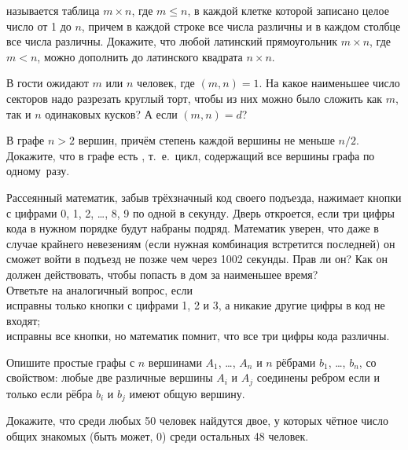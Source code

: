 \documentclass[a4paper,11pt]{article}
\begin{document}
называется таблица $m\times n$, где $m\leq n$, в каждой клетке которой записано
целое число от 1 до $n$, причем в каждой строке все числа различны
и в каждом столбце все числа различны. Докажите, что
любой латинский прямоугольник $m\times n$, где $m<n$,
можно дополнить до латинского квадрата $n\times n$.

В гости ожидают $m$ или $n$ человек, где $(m,n)=1$.
На какое наименьшее число секторов надо разрезать круглый торт,
чтобы из них можно было сложить как $m$, так и $n$ одинаковых кусков?
 А если $(m,n)=d$?



В графе $n>2$ вершин, причём степень каждой вершины не меньше $n/2$.
Докажите, что в графе есть , т.~е.~цикл,
содержащий все вершины графа по одному~разу.


 Рассеянный математик, забыв трёхзначный код своего подъезда,
нажимает кнопки с цифрами 0, 1, 2, \dots , 8, 9 по одной в секунду.
Дверь откроется, если три
цифры кода в нужном порядке будут набраны подряд. Математик уверен, что даже
в случае крайнего невезениям (если нужная комбинация встретится последней)
он сможет войти в подъезд не позже чем через 1002 секунды. Прав ли он?
Как он должен действовать, чтобы попасть в дом за наименьшее время?\\
Ответьте на аналогичный вопрос, если\\
 исправны только кнопки с цифрами 1, 2 и 3, а никакие другие цифры
в код не входят;\\
 исправны все кнопки, но математик помнит, что все три цифры кода
различны.

Опишите простые
графы с $n$ вершинами $A_1$, \dots, $A_n$ и $n$ р\"ебрами
$b_1$, \dots, $b_n$, со свойст\-вом: любые две различные
вершины $A_i$ и $A_j$
соединены ребром если и только если р\"ебра $b_i$ и $b_j$ имеют
общую вершину.

Докажите, что среди любых 50 человек найдутся двое, у которых ч\"етное
число общих знакомых (быть может, 0) среди остальных 48 человек.
\end{document}
